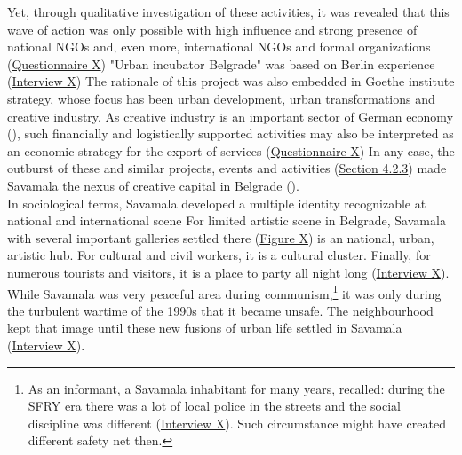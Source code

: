 \documentclass[11pt]{report}
\begin{document}
Yet, through qualitative investigation of these activities, it was revealed that this wave of action was only possible with high influence and strong presence of national NGOs and, even more, international NGOs and formal organizations
(\href{Questionnaire Experts Savamala}{Questionnaire X}) 
"Urban incubator Belgrade" was based on Berlin experience
(\href{InterviewX}{Interview X})
The rationale of this project was also embedded in Goethe institute strategy, whose focus has been urban development, urban transformations and creative industry.
As creative industry is an important sector of German economy 
(\href{Lanz}{\cite{lanz_cities_2012}}),
such financially and logistically supported activities may also be interpreted as an economic strategy for the export of services (\href{Questionnaire Experts Savamala}{Questionnaire X})
In any case, the outburst of these and similar projects, events and activities (\href{Section 4.2.3}{Section 4.2.3}) made Savamala the nexus of creative capital in Belgrade (\href{B92}{\cite{B92 2015}}). %
\\

In sociological terms, Savamala developed a multiple identity recognizable at national and international scene
For limited artistic scene in Belgrade, Savamala with several important galleries settled there (\href{Figure X}{Figure X})
is an national, urban, artistic hub.
For cultural and civil workers, it is a cultural cluster.
Finally, for numerous tourists and visitors, it is a place to party all night long (\href{InterviewX}{Interview X}).
\\

While Savamala was very peaceful area during communism,\footnote{As an informant, a Savamala inhabitant for many years, recalled: during the SFRY era there was a lot of local police in the streets and the social discipline was different
(\href{InterviewX}{Interview X}).
Such circumstance might have created different safety net then.}
it was only during the turbulent wartime of the 1990s that it became unsafe.
The neighbourhood kept that image until these new fusions of urban life settled in Savamala (\href{InterviewX}{Interview X}).
\\
\end{document}
